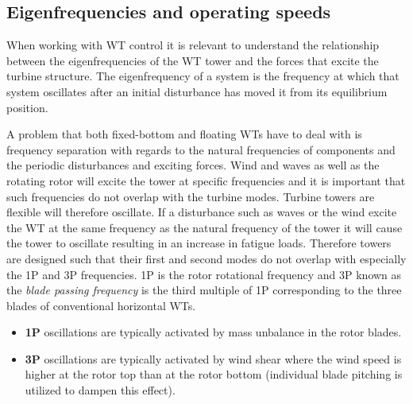 \subsection{Eigenfrequencies and operating speeds} \label{sec:eigenfreq}
When working with WT control it is relevant to understand the relationship between the eigenfrequencies of the WT tower and the forces that excite the turbine structure. The eigenfrequency of a system is the frequency at which that system oscillates after an initial disturbance has moved it from its equilibrium position.

A problem that both fixed-bottom and floating WTs have to deal with is frequency separation with regards to the natural frequencies of components and the periodic disturbances and exciting forces. Wind and waves as well as the rotating rotor will excite the tower at specific frequencies and it is important that such frequencies do not overlap with the turbine modes. Turbine towers are flexible will therefore oscillate. If a disturbance such as waves or the wind excite the WT at the same frequency as the natural frequency of the tower it will cause the tower to oscillate resulting in an increase in fatigue loads. Therefore towers are designed such that their first and second modes do not overlap with especially the 1P and 3P frequencies. 1P is the rotor rotational frequency and 3P known as the \textit{blade passing frequency} is the third multiple of 1P corresponding to the three blades of conventional horizontal WTs.
\begin{itemize}
	\item \textbf{1P} oscillations are typically activated by mass unbalance in the rotor blades.
	\item \textbf{3P} oscillations are typically activated by wind shear where the wind speed is higher at the rotor top than at the rotor bottom (individual blade pitching is utilized to dampen this effect).
\end{itemize}

